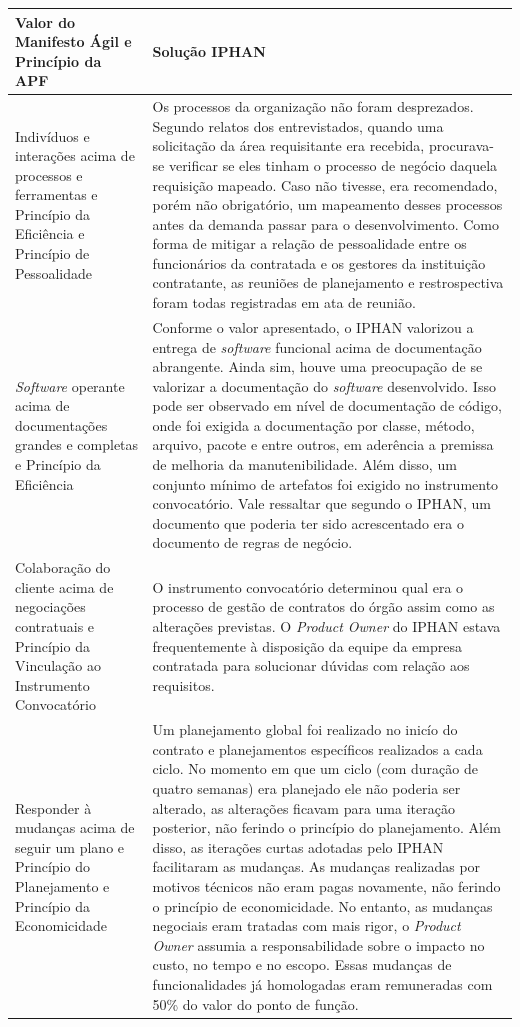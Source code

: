 \begin{table}[H]
\center
\footnotesize
\begin{tabular}{|p{6cm}|p{8cm}|}
  \hline
   \textbf{Valor do Manifesto Ágil e Princípio da APF} & \textbf{Solução IPHAN}\\
    \hline
  Indivíduos e interações acima de processos e ferramentas e Princípio da Eficiência e Princípio de Pessoalidade &  Os processos da organização não foram desprezados. Segundo relatos dos entrevistados, quando uma solicitação da área requisitante era recebida, procurava-se verificar se eles tinham o processo de negócio daquela requisição mapeado. Caso não tivesse, era recomendado, porém não obrigatório, um mapeamento desses processos antes da demanda passar para o desenvolvimento.  Como forma de mitigar a relação de pessoalidade entre os funcionários da contratada e os gestores da instituição contratante, as reuniões de planejamento e restrospectiva foram todas registradas em ata de reunião. \\
   \hline    
 \textit{Software} operante acima de documentações grandes e completas e Princípio da Eficiência & Conforme o valor apresentado, o IPHAN valorizou a entrega de \textit{software} funcional acima de documentação abrangente. Ainda sim, houve uma preocupação de se valorizar a documentação do \textit{software} desenvolvido. Isso pode ser observado em nível de documentação de código, onde foi exigida a documentação por classe, método, arquivo, pacote e entre outros, em aderência a premissa de melhoria da manutenibilidade. Além disso, um conjunto
mínimo de artefatos foi exigido no instrumento
convocatório. Vale ressaltar que segundo o IPHAN, um documento que poderia ter sido acrescentado era o documento de regras de negócio.\\
    \hline
  Colaboração do cliente acima de negociações contratuais e Princípio da Vinculação ao Instrumento Convocatório &  O instrumento convocatório determinou qual era o processo de gestão de contratos do órgão assim como as alterações previstas. O \textit{Product Owner} do IPHAN estava frequentemente à disposição da equipe da empresa contratada para solucionar dúvidas com relação aos requisitos.\\
   \hline
  Responder à mudanças acima de seguir um plano e Princípio do Planejamento e Princípio da Economicidade & Um planejamento global foi realizado no inicío do contrato e planejamentos específicos realizados a cada ciclo. No momento em que um ciclo (com duração de quatro semanas) era planejado ele não poderia ser alterado, as alterações ficavam para uma iteração posterior, não ferindo o princípio do planejamento. Além disso, as iterações curtas adotadas pelo IPHAN facilitaram as mudanças. As mudanças realizadas por motivos técnicos não eram pagas novamente, não ferindo o princípio de economicidade. No entanto, as mudanças negociais eram tratadas com mais rigor, o \textit{Product Owner} assumia a responsabilidade sobre o impacto no custo, no tempo e no escopo. Essas mudanças de funcionalidades já homologadas eram remuneradas com 50\% do valor do ponto de função. \\

\end{tabular}
\end{table}
